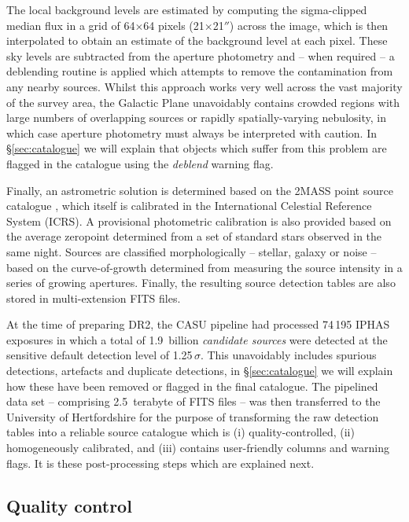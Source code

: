 \documentclass[useAMS,usenatbib]{mn2e}
\def\arcsec{$''$}
\begin{document}
The local background levels are estimated 
by computing the sigma-clipped median
flux in a grid of 64$\times$64 pixels (21$\times$21\arcsec)
across the image,
which is then interpolated to obtain an estimate 
of the background level at each pixel.
These sky levels are subtracted from the aperture photometry and
-- when required --
a deblending routine is applied which attempts to remove
the contamination from any nearby sources.
Whilst this approach works very well 
across the vast majority of the survey area,
the Galactic Plane unavoidably contains crowded regions 
with large numbers of overlapping sources
or rapidly spatially-varying nebulosity,
in which case aperture photometry must always be interpreted 
with caution.
In \S\ref{sec:catalogue} we will explain that objects
which suffer from this problem 
are flagged in the catalogue using the \emph{deblend} warning flag.

Finally, an astrometric solution is determined
based on the 2MASS point source catalogue \citep{Skrutskie2006},
which itself is calibrated 
in the International Celestial Reference System (ICRS).
A provisional photometric calibration is also provided 
based on the average zeropoint
determined from a set of standard stars observed in the same night.
Sources are classified morphologically
-- stellar, galaxy or noise --
based on the curve-of-growth determined
from measuring the source intensity in a series of growing apertures.
Finally, the resulting source detection tables are also stored 
in multi-extension FITS files.

At the time of preparing DR2,
the CASU pipeline had processed
74\,195 IPHAS exposures 
in which a total of 1.9~billion \emph{candidate sources} were detected 
at the sensitive default detection level of 1.25\,$\sigma$.
This unavoidably includes spurious detections, artefacts and
duplicate detections,
in \S\ref{sec:catalogue} we will explain
how these have been removed or flagged in the final catalogue.
The pipelined data set -- comprising 2.5~terabyte of FITS files --
was then transferred to the University of Hertfordshire
for the purpose of transforming the raw
detection tables into a reliable source catalogue which is 
(i) quality-controlled,
(ii) homogeneously calibrated, and 
(iii) contains user-friendly columns and warning flags.
It is these post-processing steps which are explained next.


\subsection{Quality control}
\label{sec:qc}
\end{document}
